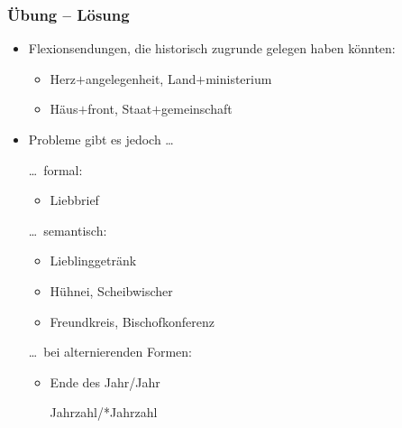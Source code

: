 
\begin{frame}
\frametitle{Übung -- Lösung}

\begin{itemize}
	\item Flexionsendungen, die historisch zugrunde gelegen haben könnten:
	
	\begin{itemize}
		\settowidth{}
		
		\item Herz$+$angelegenheit, Land$+$ministerium

		\item Häus$+$front, Staat$+$gemeinschaft
		\jambox{[Plural]}
	\end{itemize}

\pause 
	
	\item Probleme gibt es jedoch \dots
	
	\settowidth{} 
	
		\dots\ formal:
		
		\begin{itemize}
		\item Liebbrief 
		
		\end{itemize}
		\dots\ semantisch:
		
		\begin{itemize}
		\item Lieblinggetränk 
		
		\item Hühnei, Scheibwischer 
	
		\item Freundkreis, Bischofkonferenz 
		
		\end{itemize}
		\dots\ bei alternierenden Formen:
		
		\begin{itemize}
		\item Ende des Jahr/Jahr \jambox{[Genitivalternation]}	
		
			\vs Jahrzahl/*Jahrzahl 
\end{itemize}
\end{itemize}

\end{frame}